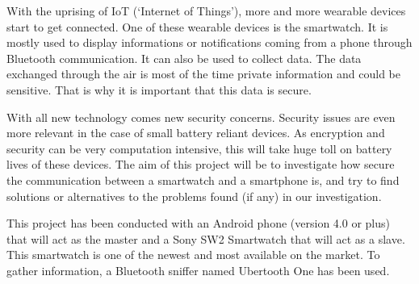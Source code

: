 
With the uprising of IoT (‘Internet of Things’), more and more wearable devices start to get connected. One of these wearable devices is the smartwatch. It is mostly used to display informations or notifications coming from a phone through Bluetooth communication. It can also be used to collect data. The data exchanged through the air is most of the time private information and could be sensitive. That is why it is important that this data is secure.

With all new technology comes new security concerns. Security issues are even more relevant in the case of small battery reliant devices. As encryption and security can be very computation intensive, this will take huge toll on battery lives of these devices. The aim of this project will be to investigate how secure the communication between a smartwatch and a smartphone is, and try to find solutions or alternatives to the problems found (if any) in our investigation.

This project has been conducted with an Android phone (version 4.0 or plus) that will act as the master and a Sony SW2 Smartwatch that will act as a slave. This smartwatch is one of the newest and most available on the market. To gather information, a Bluetooth sniffer named Ubertooth One has been used.

